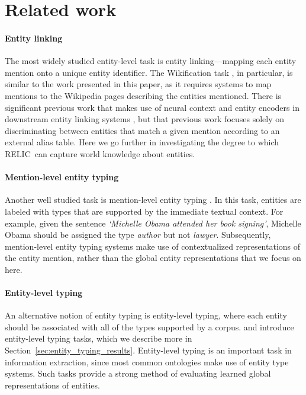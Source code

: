\documentclass{article} \usepackage{iclr2020_conference,times}
\newcommand{\ack}{RELIC\xspace}
\begin{document}
 
\section{Related work}
\label{sec:related}

\paragraph{Entity linking}
The most widely studied entity-level task is entity linking---mapping each entity mention onto a unique entity identifier. 
The Wikification task \citep{ratinov2011local, cheng2013relational}, in particular, is similar to the work presented in this paper, as it requires systems to map mentions to the Wikipedia pages describing the entities mentioned. 
There is significant previous work that makes use of neural context and entity encoders in downstream entity linking systems \citep{sun2015modeling, yamada2016joint, yamada-etal-2017-learning, gupta2017entity, murty2018hierarchical,kolistas2018end}, but that previous work focuses solely on discriminating between entities that match a given mention according to an external alias table. Here we go further in investigating the degree to which \ack~can capture world knowledge about entities.

\paragraph{Mention-level entity typing}
Another well studied task is mention-level entity typing \citep[e.g.][]{ling2012fine, choi2018ultra}. 
In this task, entities are labeled with types that are supported by the immediate textual context. 
For example, given the sentence {\it `Michelle Obama attended her book signing'}, Michelle Obama should be assigned the type {\it author} but not {\it lawyer}. 
Subsequently, mention-level entity typing systems make use of contextualized representations of the entity mention, rather than the global entity representations that we focus on here.


\paragraph{Entity-level typing}
An alternative notion of entity typing is entity-level typing, where each entity should be associated with all of the types supported by a corpus.
\citet{yaghoobzadeh2015corpus} and \citet{murty2018hierarchical} introduce entity-level typing tasks, which we describe more in Section~\ref{sec:entity_typing_results}. 
Entity-level typing is an important task in information extraction, since most common ontologies make use of entity type systems. Such tasks provide a strong method of evaluating learned global representations of entities.
\end{document}
